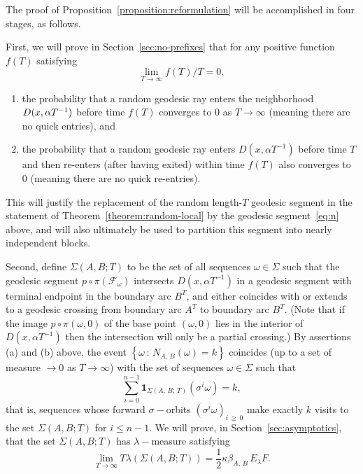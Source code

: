 \documentclass[10pt]{amsart}
\theoremstyle{definition}\newtheorem{defi}[theo]{Definition}\newtheorem{rema}[theo]{Remark}\newtheorem{exam}[theo]{Example}\newtheorem{exem}[theo]{Example}\newtheorem{nota}[theo]{Notation}
\newcommand{\xset}[1]{\left\{ #1 \right\}}
\newcommand*{\alphenumi}{\renewcommand*{\theenumi}{\alph{enumi}}}
\begin{document}
The proof of Proposition~\ref{proposition:reformulation} will be accomplished in four stages, as follows.

First, we will prove in Section~\ref{sec:no-prefixes} that for any positive function $f(T)$ satisfying
\[
\lim_{T \rightarrow \infty}f(T)/T=0,
\]
\begin{enumerate}\alphenumi
\item \label{list4.1.1}the probability that a random geodesic ray enters the neighborhood $D(x,\linebreak\alpha T^{-1})$ before time $f(T)$ converges to $0$ as $T \rightarrow\infty$ (meaning there are no quick entries), and
\item \label{list4.1.2}the probability that a random geodesic ray enters $D(x, \alpha T^{-1})$ before time $T$ and then re-enters (after having exited) within time $f(T)$ also converges to $0$ (meaning there are no quick re-entries).
\end{enumerate}
This will justify the replacement of the random length-$T$ geodesic segment in the statement of Theorem~\ref{theorem:random-local} by the geodesic segment~\eqref{eq:n} above, and will also ultimately be used to partition this segment into nearly independent blocks.


Second, define $\Sigma (A,B;T)$ to be the set of all sequences $\omega \in \Sigma$ such that the geodesic segment $p\circ\pi(\mathcal{F}_{\omega})$ intersects $D(x, \alpha T^{-1})$ in a geodesic segment with terminal endpoint in the boundary arc $B^{T}$, and either coincides with or extends to a geodesic crossing from boundary arc $A^{T}$ to boundary arc $B^{T}$. (Note that if the image $p\circ\pi (\omega,0)$ of the base point $(\omega,0)$ lies in the interior of $D(x, \alpha T^{-1})$ then the intersection will only be a partial crossing.) By assertions (a) and (b) above, the event $\xset {\omega \,:\, N_{A,\,B}(\omega)=k}$ coincides (up to a set of measure $\rightarrow 0$ as $T \rightarrow \infty$) with the set of sequences $\omega \in \Sigma$ such that
\[
\sum_{i=0}^{n-1}\mathbf{1} _{\Sigma(A,\,B;\,T)}(\sigma^{i}\omega)=k,
\]
that is, sequences whose forward $\sigma-$orbits $(\sigma^{i}\omega)_{i\,\geq\,0}$ make exactly $k$ visits to the set $\Sigma(A,B;T)$ for $i \leq n-1$. We will prove, in Section~\ref{sec:asymptotics}, that the set $\Sigma(A,B;T)$ has $\lambda-$measure satisfying
\begin{equation}\label{eq:measure-asymptotics}
\lim_{T \rightarrow \infty} T\lambda (\Sigma (A,B;T))=  \frac{1}{2} \kappa \beta_{A,\,B}\,E_{\lambda}F.
\end{equation}
\end{document}
